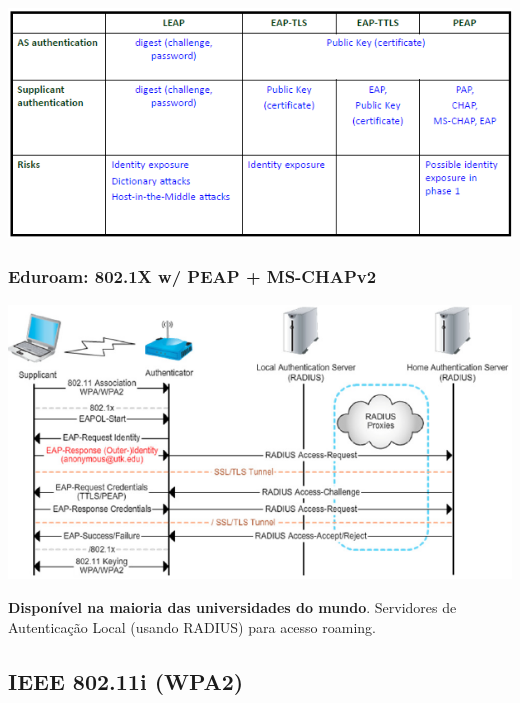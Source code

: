 \documentclass{article}
\begin{document}
\begin{center}
  \includegraphics[scale=0.6]{56}
\end{center}

\pagebreak

\subsubsection{Eduroam: 802.1X w/ PEAP + MS-CHAPv2}

\begin{center}
  \includegraphics[scale=0.6]{57}
\end{center}

\textbf{Disponível na maioria das universidades do mundo}.
Servidores de Autenticação Local (usando RADIUS) para acesso roaming.

\subsection{IEEE 802.11i (WPA2)}
\end{document}
